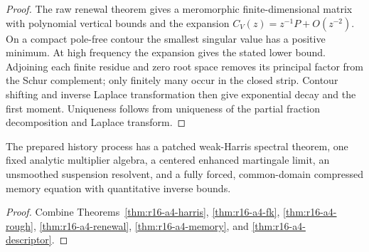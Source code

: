 \begin{proof}
The raw renewal theorem gives a meromorphic finite-dimensional matrix with
polynomial vertical bounds and the expansion \(C_V(z)=z^{-1}P+O(z^{-2})\).
On a compact pole-free contour the smallest singular value has a positive
minimum.  At high frequency the expansion gives the stated lower bound.
Adjoining each finite residue and zero root space removes its principal factor
from the Schur complement; only finitely many occur in the closed strip.
Contour shifting and inverse Laplace transformation then give exponential
decay and the first moment.  Uniqueness follows from uniqueness of the partial
fraction decomposition and Laplace transform.
\end{proof}

\begin{theorem}
\label{thm:r16-a4-main}
The prepared history process has a patched weak-Harris spectral theorem, one
fixed analytic multiplier algebra, a centered enhanced martingale limit, an
unsmoothed suspension resolvent, and a fully forced, common-domain compressed
memory equation with quantitative inverse bounds.
\end{theorem}

\begin{proof}
Combine Theorems~\ref{thm:r16-a4-harris},
\ref{thm:r16-a4-fk}, \ref{thm:r16-a4-rough},
\ref{thm:r16-a4-renewal}, \ref{thm:r16-a4-memory}, and
\ref{thm:r16-a4-descriptor}.
\end{proof}
